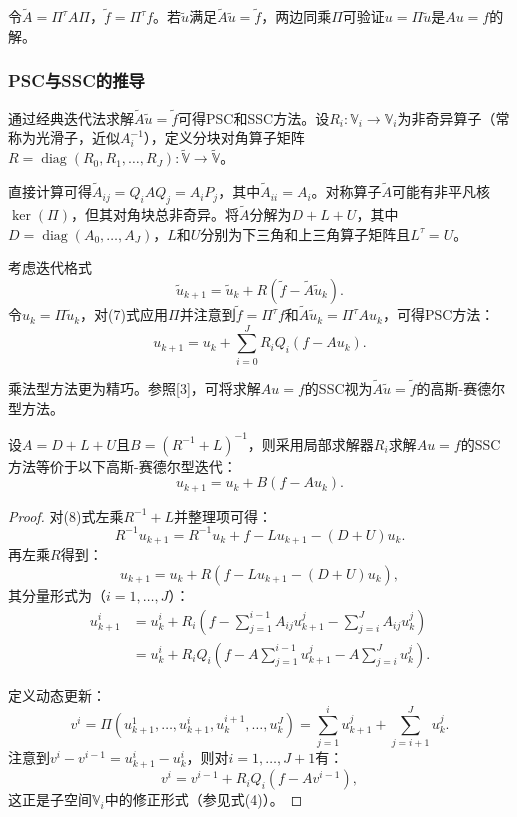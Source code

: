 \documentclass[letterpaper,12pt]{article}
\begin{document}
令$\tilde{A}=\Pi^\tau A\Pi$，$\tilde{f}=\Pi^\tau f$。若$\tilde{u}$满足$\tilde{A}\tilde{u}=\tilde{f}$，两边同乘$\Pi$可验证$u=\Pi\tilde{u}$是$Au=f$的解。

\subsubsection{PSC与SSC的推导}
通过经典迭代法求解$\tilde{A}\tilde{u}=\tilde{f}$可得PSC和SSC方法。设$R_i:\mathbb{V}_i\to \mathbb{V}_i$为非奇异算子（常称为光滑子，近似$A_i^{-1}$），定义分块对角算子矩阵$R=\operatorname{diag}(R_0,R_1,\ldots,R_J):\tilde{\mathbb{V}}\to\tilde{\mathbb{V}}$。

直接计算可得$\tilde{A}_{ij}=Q_iAQ_j=A_iP_j$，其中$\tilde{A}_{ii}=A_i$。对称算子$\tilde{A}$可能有非平凡核$\ker(\Pi)$，但其对角块总非奇异。将$\tilde{A}$分解为$D+L+U$，其中$D=\operatorname{diag}(A_0,\ldots,A_J)$，$L$和$U$分别为下三角和上三角算子矩阵且$L^\tau=U$。

考虑迭代格式
\[
\tilde{u}_{k+1} = \tilde{u}_k + R(\tilde{f} - \tilde{A}\tilde{u}_k).
\]
令$u_k=\Pi\tilde{u}_k$，对(7)式应用$\Pi$并注意到$\tilde{f}=\Pi^\tau f$和$\tilde{A}\tilde{u}_k=\Pi^\tau Au_k$，可得PSC方法：
\[
u_{k+1} = u_k + \sum_{i=0}^J R_i Q_i(f - Au_k).
\]

乘法型方法更为精巧。参照[3]，可将求解$Au=f$的SSC视为$\tilde{A}\tilde{u}=\tilde{f}$的高斯-赛德尔型方法。

\begin{lemma}[3.1]
设$A = D + L + U$且$B = (R^{-1} + L)^{-1}$，则采用局部求解器$R_i$求解$Au=f$的SSC方法等价于以下高斯-赛德尔型迭代：
\[ u_{k+1} = u_k + B(f - Au_k). \]
\end{lemma}

\begin{proof}
对(8)式左乘$R^{-1} + L$并整理项可得：
\[ R^{-1}u_{k+1} = R^{-1}u_k + f - Lu_{k+1} - (D + U)u_k. \]
再左乘$R$得到：
\[ u_{k+1} = u_k + R \left( f - Lu_{k+1} - (D + U)u_k \right), \]
其分量形式为（$i=1,\ldots,J$）：
\[
\begin{aligned}
u^{i}_{k+1} &= u^{i}_k + R_i \left( f - \sum_{j=1}^{i-1} A_{ij}u^{j}_{k+1} - \sum_{j=i}^{J} A_{ij}u^{j}_k \right) \\
&= u^{i}_k + R_i Q_i \left( f - A\sum_{j=1}^{i-1} u^{j}_{k+1} - A\sum_{j=i}^{J} u^{j}_k \right).
\end{aligned}
\]

定义动态更新：
\[
v^{i} = \Pi \left( u^{1}_{k+1}, \ldots, u^{i}_{k+1}, u^{i+1}_k, \ldots, u^{J}_k \right) = \sum_{j=1}^{i} u^{j}_{k+1} + \sum_{j=i+1}^{J} u^{j}_k.
\]
注意到$v^{i} - v^{i-1} = u^{i}_{k+1} - u^{i}_k$，则对$i=1,\ldots,J+1$有：
\[
v^{i} = v^{i-1} + R_i Q_i (f - Av^{i-1}),
\]
这正是子空间$\mathbb{V}_i$中的修正形式（参见式(4)）。
\end{proof}
\end{document}
